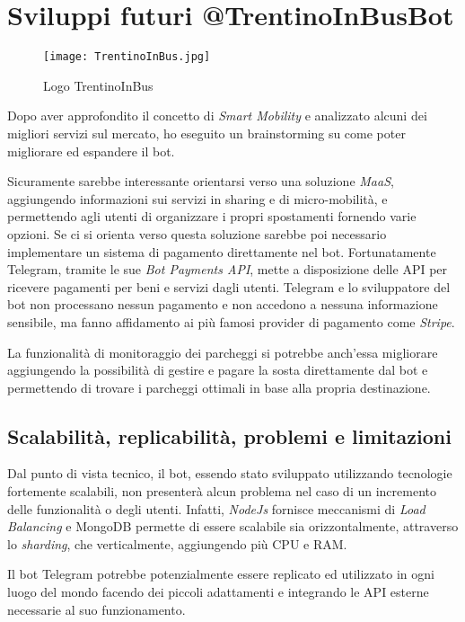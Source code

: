 \section{Sviluppi futuri @TrentinoInBusBot}
\label{sec:sviluppi_futuri}

\begin{wrapfigure}{r}{0.38\textwidth}
\centering
\texttt{[image: TrentinoInBus.jpg]}
\caption{Logo TrentinoInBus}
\label{fig:trentino_in_bus}
\end{wrapfigure}

Dopo aver approfondito il concetto di \textit{Smart Mobility} e analizzato alcuni dei migliori servizi sul mercato, ho eseguito un brainstorming su come poter migliorare ed espandere il bot. 

Sicuramente sarebbe interessante orientarsi verso una soluzione \textit{MaaS}, aggiungendo informazioni sui servizi in sharing e di micro-mobilità, e permettendo agli utenti di organizzare i propri spostamenti fornendo varie opzioni. Se ci si orienta verso questa soluzione sarebbe poi necessario implementare un sistema di pagamento direttamente nel bot. Fortunatamente Telegram, tramite le sue \textit{Bot Payments API}, mette a disposizione delle API per ricevere pagamenti per beni e servizi dagli utenti. Telegram e lo sviluppatore del bot non processano nessun pagamento e non accedono a nessuna informazione sensibile, ma fanno affidamento ai più famosi provider di pagamento come \textit{Stripe}.

La funzionalità di monitoraggio dei parcheggi si potrebbe anch'essa migliorare aggiungendo la possibilità di gestire e pagare la sosta direttamente dal bot e permettendo di trovare i parcheggi ottimali in base alla propria destinazione.

\subsection{Scalabilità, replicabilità, problemi e limitazioni}
\label{sec:scalabilita}
Dal punto di vista tecnico, il bot, essendo stato sviluppato utilizzando tecnologie fortemente scalabili, non presenterà alcun problema nel caso di un incremento delle funzionalità o degli utenti. Infatti, \textit{NodeJs} fornisce meccanismi di \textit{Load Balancing} e MongoDB permette di essere scalabile sia orizzontalmente, attraverso lo \textit{sharding}, che verticalmente, aggiungendo più CPU e RAM.


Il bot Telegram  potrebbe potenzialmente essere replicato ed utilizzato in ogni luogo del mondo facendo dei piccoli adattamenti e integrando le API esterne necessarie al suo funzionamento.


